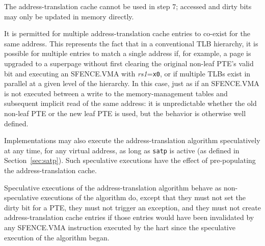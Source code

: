 The address-translation cache cannot be used in step 7; accessed and
dirty bits may only be updated in memory directly.

\begin{commentary}
  It is permitted for multiple address-translation cache entries to co-exist
  for the same address.  This represents the fact that in a conventional TLB
  hierarchy, it is possible for multiple entries to match a single address if, for
  example, a page is upgraded to a superpage without first clearing the
  original non-leaf PTE's valid bit and executing an SFENCE.VMA with {\em
  rs1}={\tt x0}, or if multiple TLBs exist in parallel at a given level of the
  hierarchy.  In this case, just as if an SFENCE.VMA is not executed between
  a write to the memory-management tables and subsequent implicit read of the
  same address: it is unpredictable whether the old non-leaf PTE or the new leaf
  PTE is used, but the behavior is otherwise well defined.
\end{commentary}

Implementations may also execute the address-translation algorithm
speculatively at any time, for any virtual address, as long as {\tt satp} is
active (as defined in Section~\ref{sec:satp}).  Such speculative executions
have the effect of pre-populating the address-translation cache.

Speculative executions of the address-translation algorithm behave as
non-speculative executions of the algorithm do, except that they must not set the
dirty bit for a PTE, they must not trigger an exception, and they must not create
address-translation cache entries if those entries would have been invalidated
by any SFENCE.VMA instruction executed by the hart since the speculative
execution of the algorithm began.

